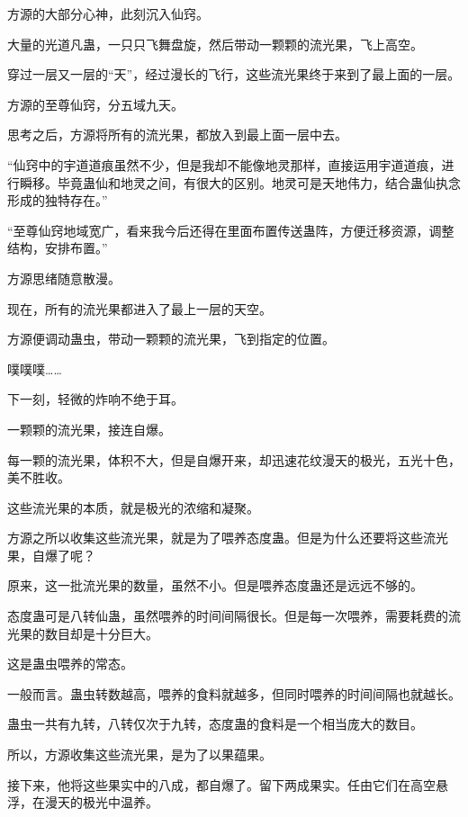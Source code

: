 
\begin{this_body}



方源的大部分心神，此刻沉入仙窍。

大量的光道凡蛊，一只只飞舞盘旋，然后带动一颗颗的流光果，飞上高空。

穿过一层又一层的“天”，经过漫长的飞行，这些流光果终于来到了最上面的一层。

方源的至尊仙窍，分五域九天。

思考之后，方源将所有的流光果，都放入到最上面一层中去。

“仙窍中的宇道道痕虽然不少，但是我却不能像地灵那样，直接运用宇道道痕，进行瞬移。毕竟蛊仙和地灵之间，有很大的区别。地灵可是天地伟力，结合蛊仙执念形成的独特存在。”

“至尊仙窍地域宽广，看来我今后还得在里面布置传送蛊阵，方便迁移资源，调整结构，安排布置。”

方源思绪随意散漫。

现在，所有的流光果都进入了最上一层的天空。

方源便调动蛊虫，带动一颗颗的流光果，飞到指定的位置。

噗噗噗……

下一刻，轻微的炸响不绝于耳。

一颗颗的流光果，接连自爆。

每一颗的流光果，体积不大，但是自爆开来，却迅速花纹漫天的极光，五光十色，美不胜收。

这些流光果的本质，就是极光的浓缩和凝聚。

方源之所以收集这些流光果，就是为了喂养态度蛊。但是为什么还要将这些流光果，自爆了呢？

原来，这一批流光果的数量，虽然不小。但是喂养态度蛊还是远远不够的。

态度蛊可是八转仙蛊，虽然喂养的时间间隔很长。但是每一次喂养，需要耗费的流光果的数目却是十分巨大。

这是蛊虫喂养的常态。

一般而言。蛊虫转数越高，喂养的食料就越多，但同时喂养的时间间隔也就越长。

蛊虫一共有九转，八转仅次于九转，态度蛊的食料是一个相当庞大的数目。

所以，方源收集这些流光果，是为了以果蕴果。

接下来，他将这些果实中的八成，都自爆了。留下两成果实。任由它们在高空悬浮，在漫天的极光中温养。


\end{this_body}
